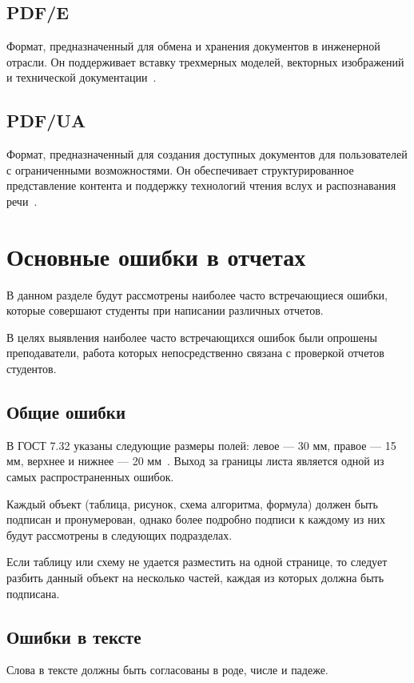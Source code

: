 \subsection{PDF/E}
Формат, предназначенный для обмена и хранения документов в инженерной отрасли. Он поддерживает вставку трехмерных моделей, векторных изображений и технической документации~\cite{abdobe_PDF}.
\subsection{PDF/UA}
Формат, предназначенный для создания доступных документов для пользователей с ограниченными возможностями. Он обеспечивает структурированное представление контента и поддержку технологий чтения вслух и распознавания речи~\cite{abdobe_PDF}.






\section{Основные ошибки в отчетах}
В данном разделе будут рассмотрены наиболее часто встречающиеся ошибки, которые совершают студенты при написании различных отчетов.

В целях выявления наиболее часто встречающихся ошибок были опрошены преподаватели, работа которых непосредственно связана с проверкой отчетов студентов.

\subsection{Общие ошибки}
В ГОСТ 7.32 указаны следующие размеры полей: левое --- 30 мм, правое --- 15 мм, верхнее и нижнее --- 20 мм~\cite{GOST732}. Выход за границы листа является одной из самых распространенных ошибок.

Каждый объект (таблица, рисунок, схема алгоритма, формула) должен быть подписан и пронумерован, однако более подробно подписи к каждому из них будут рассмотрены в следующих подразделах.

Если таблицу или схему не удается разместить на одной странице, то следует разбить данный объект на несколько частей, каждая из которых должна быть подписана.

\subsection{Ошибки в тексте}
Слова в тексте должны быть согласованы в роде, числе и падеже.

